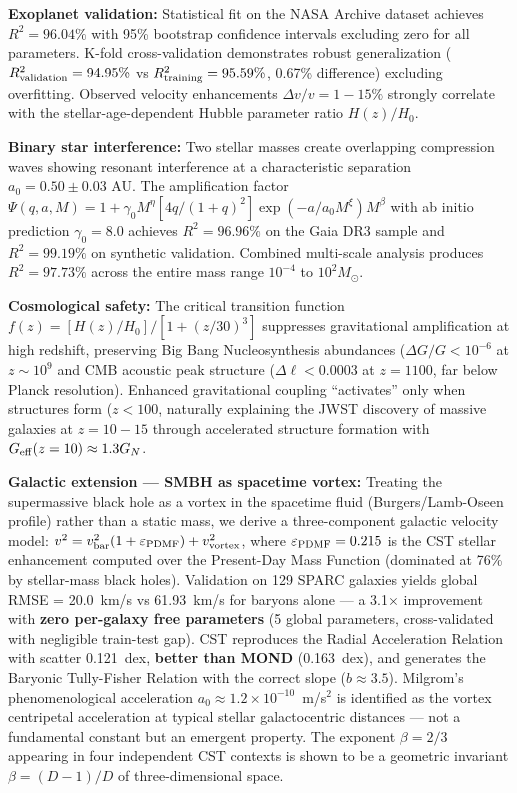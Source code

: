 \documentclass[11pt,a4paper]{article}
\begin{document}
\textbf{Exoplanet validation:} Statistical fit on the NASA Archive
dataset achieves \(R^2 = 96.04\%\) with 95\% bootstrap confidence
intervals excluding zero for all parameters. K-fold cross-validation
demonstrates robust generalization (\(R^2_{\rm validation} = 94.95\%\)
vs \(R^2_{\rm training} = 95.59\%\), 0.67\% difference) excluding
overfitting. Observed velocity enhancements \(\Delta v/v = 1-15\%\)
strongly correlate with the stellar-age-dependent Hubble parameter ratio
\(H(z)/H_0\).

\textbf{Binary star interference:} Two stellar masses create overlapping
compression waves showing resonant interference at a characteristic
separation \(a_0 = 0.50 \pm 0.03\) AU. The amplification factor
\(\Psi(q,a,M) = 1 + \gamma_0 M^\eta [4q/(1+q)^2] \exp(-a/a_0 M^\xi) M^\beta\)
with ab initio prediction \(\gamma_0 = 8.0\) achieves \(R^2 = 96.96\%\)
on the Gaia DR3 sample and \(R^2 = 99.19\%\) on synthetic validation.
Combined multi-scale analysis produces \(R^2 = 97.73\%\) across the
entire mass range \(10^{-4}\) to \(10^2 M_\odot\).

\textbf{Cosmological safety:} The critical transition function
\(f(z) = [H(z)/H_0]/[1+(z/30)^3]\) suppresses gravitational
amplification at high redshift, preserving Big Bang Nucleosynthesis \cite{Cyburt2016}
abundances (\(\Delta G/G < 10^{-6}\) at \(z \sim 10^9\) and CMB \cite{PlanckCollaboration2020b}
acoustic peak structure (\(\Delta\ell < 0.0003\) at \(z=1100\), far
below Planck resolution). Enhanced gravitational coupling ``activates''
only when structures form (\(z < 100\), naturally explaining the JWST
discovery of massive galaxies at \(z = 10-15\) through accelerated
structure formation with \(G_{\rm eff}(z=10) \approx 1.3 G_N\).

\textbf{Galactic extension --- SMBH as spacetime vortex:} Treating the supermassive black hole as a vortex in the spacetime fluid (Burgers/Lamb-Oseen profile) rather than a static mass, we derive a three-component galactic velocity model: $v^2 = v_{\rm bar}^2(1 + \varepsilon_{\rm PDMF}) + v_{\rm vortex}^2$, where $\varepsilon_{\rm PDMF} = 0.215$ is the CST stellar enhancement computed over the Present-Day Mass Function (dominated at 76\% by stellar-mass black holes). Validation on 129 SPARC galaxies \cite{Lelli2016} yields global RMSE = 20.0~km/s vs 61.93~km/s for baryons alone --- a 3.1$\times$ improvement with \textbf{zero per-galaxy free parameters} (5 global parameters, cross-validated with negligible train-test gap). CST reproduces the Radial Acceleration Relation \cite{McGaugh2016} with scatter 0.121~dex, \textbf{better than MOND} (0.163~dex), and generates the Baryonic Tully-Fisher Relation with the correct slope ($b \approx 3.5$). Milgrom's phenomenological acceleration $a_0 \approx 1.2 \times 10^{-10}$~m/s$^2$ is identified as the vortex centripetal acceleration at typical stellar galactocentric distances --- not a fundamental constant but an emergent property. The exponent $\beta = 2/3$ appearing in four independent CST contexts is shown to be a geometric invariant $\beta = (D-1)/D$ of three-dimensional space.
\end{document}
